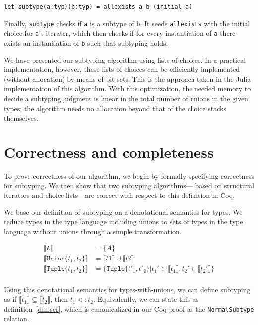 \documentclass[a4paper,english]{lipics-v2019}
\newcommand{\xt}[1]{\texttt{#1}}
\newcommand{\tuplet}[2]{\xt{Tuple\{}#1,#2\xt{\}}}
\newcommand{\union}[2]{\xt{Union\{}#1,#2\xt{\}}}
\newcommand{\denotes}[1]{\llbracket #1 \rrbracket}
\begin{document}
\begin{lstlisting}
let subtype(a:typ)(b:typ) = allexists a b (initial a)
\end{lstlisting}

Finally, \verb|subtype| checks if \verb|a| is a subtype of \verb|b|.
It seeds \verb|allexists| with the initial choice for \verb|a|'s
iterator, which then checks if for every instantiation of \verb|a|
there exists an instantiation of \verb|b| such that subtyping holds.

We have presented our subtyping algorithm using lists of choices. In a
practical implementation, however, these lists of choices can be efficiently
implemented (without allocation) by means of bit sets. This is the approach
taken in the Julia implementation of this algorithm. With this optimization,
the needed memory to decide a subtyping judgment is linear in the total number
of unions in the given types; the algorithm needs no allocation beyond that
of the choice stacks themselves.

\section{Correctness and completeness}

To prove correctness of our algorithm, we begin by formally specifying
correctness for subtyping. We then show that two subtyping algorithms---
based on structural iterators and choice lists---are correct
with respect to this definition in Coq.

We base our definition of subtyping on a denotational semantics for types. 
We reduce types in the type language including unions to sets of types
in the type language without unions through a simple transformation. 

\begin{align*}
\denotes{\xt{A}} &= \{A\} \\
\denotes{\union{t_1}{t_2}} &= \denotes{t1} \cup \denotes{t2} \\
\denotes{\tuplet{t_1}{t_2}} &= \{\tuplet{t'_1}{t'_2} | t_1' \in \denotes{t_1},  t_2' \in \denotes{t_2'}\} \\
\end{align*}

Using this denotational semantics for types-with-unions, we can define
subtyping as if $\denotes{t_1} \subseteq \denotes{t_2}$, then $t_1 <: t_2$.
Equivalently, we can state this as definition~\ref{dfn:scr}, which is canonicalized
in our Coq proof as the \verb|NormalSubtype| relation.
\end{document}
